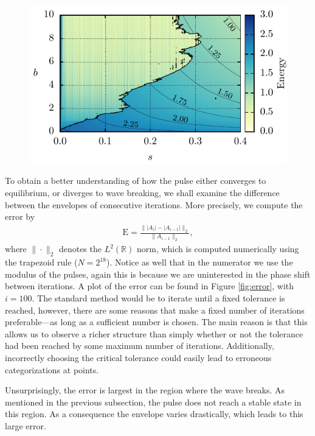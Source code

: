 \documentclass[10pt,twocolumn,a4paper]{article}
\begin{document}
\begin{figure}[htbp]
	\centering
	\includegraphics{ParamSpaceEnergy}
	\caption{}
	\label{fig:}
\end{figure}

To obtain a better understanding of how the pulse either converges to equilibrium, or diverges to wave breaking, we shall examine the difference between the envelopes of consecutive iterations. More precisely, we compute the error by
\begin{align}
	\textrm{E} = \frac{\| |A_i| - |A_{i-1}| \|_2}{\| A_{i-1} \|_2},
	\label{eq:error}
\end{align}
where $\| \cdot \|_2$ denotes the $L^2(\mathbb{R})$ norm, which is computed numerically using the trapezoid rule ($N = 2^{18}$). Notice as well that in the numerator we use the modulus of the pulses, again this is because we are uninterested in the phase shift between iterations. A plot of the error can be found in Figure \ref{fig:error}, with $i = 100$. The standard method would be to iterate until a fixed tolerance is reached, however, there are some reasons that make a fixed number of iterations preferable---as long as a sufficient number is chosen. The main reason is that this allows us to observe a richer structure than simply whether or not the tolerance had been reached by some maximum number of iterations. Additionally, incorrectly choosing the critical tolerance could easily lead to erroneous categorizations at points.

Unsurprisingly, the error is largest in the region where the wave breaks. As mentioned in the previous subsection, the pulse does not reach a stable state in this region. As a consequence the envelope varies drastically, which leads to this large error.
\end{document}
